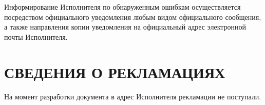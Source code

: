 \documentclass[russian, utf8, 12pt,pointsubsection,floatsubsection]{eskdtext}
\begin{document}
Информирование Исполнителя по обнаруженным ошибкам осуществляется посредством
официального уведомления любым видом официального сообщения, а также направления копии уведомления на официальный адрес электронной почты Исполнителя.

\section{СВЕДЕНИЯ О РЕКЛАМАЦИЯХ}
На момент разработки документа в адрес Исполнителя рекламации не поступали.

\end{document}
